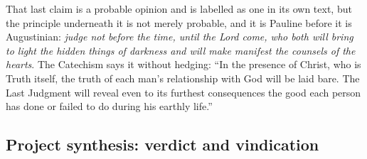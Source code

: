 That last claim is a probable opinion and is labelled as one in its own text, but the principle underneath it is not merely probable, and it is Pauline before it is Augustinian: \emph{judge not before the time, until the Lord come, who both will bring to light the hidden things of darkness and will make manifest the counsels of the hearts}. The Catechism says it without hedging: ``In the presence of Christ, who is Truth itself, the truth of each man's relationship with God will be laid bare. The Last Judgment will reveal even to its furthest consequences the good each person has done or failed to do during his earthly life.''

\subsection{Project synthesis: verdict and vindication}\label{sec:synthesis}

